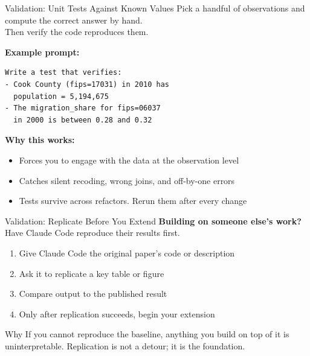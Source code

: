 \documentclass[aspectratio=169, 11pt]{beamer}
\begin{document}
\begin{frame}[fragile]{Validation: Unit Tests Against Known Values}
  Pick a handful of observations and compute the correct answer by hand.\\
  Then verify the code reproduces them.

  \vspace{0.5em}
  \textbf{Example prompt:}
  \begin{lstlisting}
Write a test that verifies:
- Cook County (fips=17031) in 2010 has
  population = 5,194,675
- The migration_share for fips=06037
  in 2000 is between 0.28 and 0.32
  \end{lstlisting}

  \vspace{0.5em}
  \textbf{Why this works:}
  \begin{itemize}
    \item Forces you to engage with the data at the observation level
    \item Catches silent recoding, wrong joins, and off-by-one errors
    \item Tests survive across refactors. Rerun them after every change
  \end{itemize}
\end{frame}

\begin{frame}{Validation: Replicate Before You Extend}
  \textbf{Building on someone else's work?}\\
  Have Claude Code reproduce their results first.

  \vspace{0.5em}
  \begin{enumerate}
    \item Give Claude Code the original paper's code or description
    \item Ask it to replicate a key table or figure
    \item Compare output to the published result
    \item Only after replication succeeds, begin your extension
  \end{enumerate}

  \vspace{0.5em}
  \begin{alertblock}{Why}
    If you cannot reproduce the baseline, anything you build on top of it is uninterpretable. Replication is not a detour; it is the foundation.
  \end{alertblock}
\end{frame}
\end{document}
